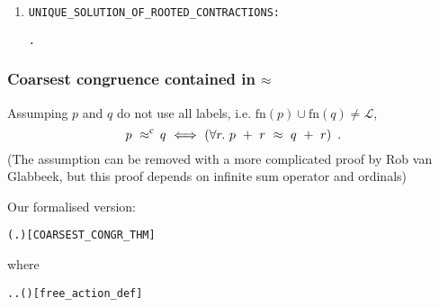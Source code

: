 \begin{frame}
\begin{small}
\begin{enumerate}
\begin{alltt}
\end{alltt}
\item \texttt{UNIQUE_SOLUTION_OF_ROOTED_CONTRACTIONS:}
\begin{alltt}
\HOLTokenTurnstile{}   \HOLSymConst{\HOLTokenImp{}} \HOLSymConst{\HOLTokenForall{}} .  \HOLSymConst{\HOLTokenObsContracts}   \HOLSymConst{\HOLTokenConj{}}  \HOLSymConst{\HOLTokenObsContracts}   \HOLSymConst{\HOLTokenImp{}}  \HOLSymConst{\HOLTokenObsCongr} 
\end{alltt}
\end{enumerate}
\end{small}
\end{frame}

\begin{frame}
\frametitle{Coarsest congruence contained in $\approx$}
\begin{theorem}
Assumping $p$ and $q$ do not use all labels, i.e. $\mathrm{fn}(p) \cup
\mathrm{fn}(q) \neq \mathscr{L}$,
\begin{equation*}
p\ \mathrel{\approx^{\mathrm{c}}}\ \! q\ \Longleftrightarrow\ ( \forall r.\ p\ +\
r\ \approx\ q\ +\ r )\enspace.
\end{equation*}
(The assumption can be removed with a
more complicated proof by Rob van Glabbeek, but this proof depends on infinite
sum operator and ordinals)
\end{theorem}
Our formalised version:
\begin{small}
\begin{alltt}
\HOLTokenTurnstile{}   \HOLSymConst{\HOLTokenConj{}}   \HOLSymConst{\HOLTokenImp{}}
   ( \HOLSymConst{\HOLTokenObsCongr} \HOLFreeVar{q} \HOLSymConst{\HOLTokenEquiv{}} \HOLSymConst{\HOLTokenForall{}}\HOLBoundVar{r}. \HOLFreeVar{p} \HOLSymConst{\ensuremath{+}}  \HOLSymConst{\HOLTokenWeakEQ}  \HOLSymConst{\ensuremath{+}} )\hfill{[COARSEST_CONGR_THM]}
\end{alltt}
where
\begin{alltt}
  \HOLSymConst{\HOLTokenEquiv{}} \HOLSymConst{\HOLTokenExists{}}. \HOLSymConst{\HOLTokenForall{}}. \HOLSymConst{\HOLTokenNeg{}}( \HOLTokenWeakTransBegin{} \HOLTokenWeakTransEnd {})\hfill{[free_action_def]}
\end{alltt}
\end{small}
\end{frame}

